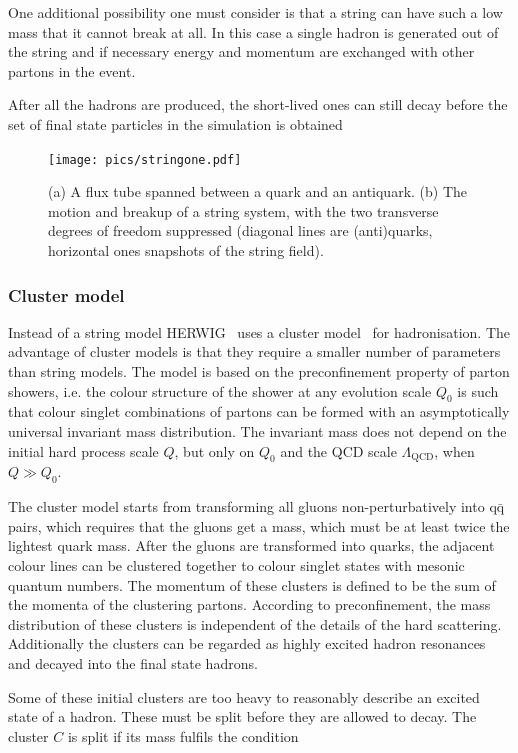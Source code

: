One additional possibility one must consider is that a string can have such a low mass that it cannot break at all. In this case a single hadron is generated out of the string and if necessary  energy and momentum are exchanged with other partons in the event.

After all the hadrons are produced, the short-lived ones can still decay before the set of final state particles in the simulation is obtained~\cite{}
\begin{figure}
\centering
\texttt{[image: pics/stringone.pdf]}
\caption[]{ (a) A flux tube spanned between a quark and an antiquark. (b) The motion
and breakup of a string system, with the two transverse degrees of freedom suppressed
(diagonal lines are (anti)quarks, horizontal ones snapshots of the string field).
\cite{eventGenerators} }
\label{fig:fluxtube}
\end{figure}

\subsubsection*{Cluster model}
Instead of a string model HERWIG~\cite{} uses a cluster model~\cite{herwigManual} for hadronisation. The advantage of cluster models is that they require a smaller number of parameters than string models. The model is based on the preconfinement property of parton showers, i.e. the colour structure of the shower at any evolution scale $Q_0$ is such that colour singlet combinations of partons can be formed with an asymptotically 
universal invariant mass distribution. The invariant mass does not depend on the initial hard process scale $Q$, but only on $Q_0$ and the QCD scale $\Lambda _ \mathrm{QCD}$, when $Q \gg Q_0$.

The cluster model starts from transforming all gluons non-perturbatively into $\mathrm{q \bar q}$ pairs, which requires that the gluons get a mass, which must be at least twice the lightest quark mass. After the gluons are transformed into quarks, the adjacent colour lines can be clustered together to colour singlet states with mesonic quantum numbers. The momentum of these clusters is defined to be the sum of the momenta of the clustering partons. According to preconfinement, the mass distribution of these clusters is independent of the details of the hard scattering. Additionally the clusters can be regarded as highly excited hadron resonances and decayed into the final state hadrons.

Some of these initial clusters are too heavy to reasonably describe an excited state of a hadron. These must be
split before they are allowed to decay. The cluster $C$ is split if its mass fulfils the condition~\cite{}

